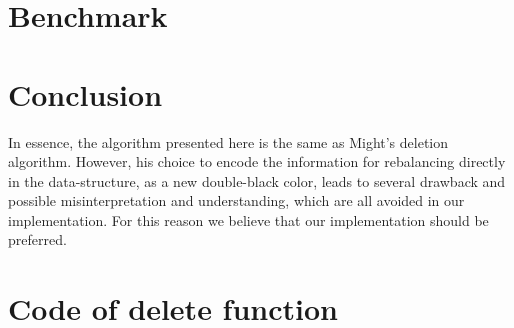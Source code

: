 \documentclass[10pt,a4paper]{article}
\begin{document}
\section{Benchmark}

\section{Conclusion}

In essence, the algorithm presented here is the same as Might's deletion algorithm. However, his choice to encode the information for rebalancing directly in the data-structure, as a new double-black color, leads to several drawback and possible misinterpretation and understanding, which are all avoided in our implementation. For this reason we believe that our implementation should be preferred.

\newpage

\appendix

\section{Code of delete function}
\label{sec:ann1}
\end{document}
